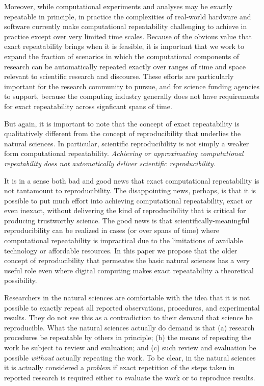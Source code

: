 Moreover, while computational experiments and analyses may be exactly repeatable in principle, 
	in practice the complexities of real-world hardware and software currently make computational repeatability 
	challenging to achieve in practice except over very limited time scales.
Because of the obvious value that exact repeatability brings when it is feasible, it is important that we work to
	expand the fraction of scenarios in which the computational components of research can be automatically 
	repeated exactly over ranges of time and space relevant to scientific research and discourse.
These efforts are particularly important for the research community to pursue, and for science funding
	agencies to support, because the computing industry generally does not have requirements for exact 
	repeatability across signficant spans of time.

But again, it is important to note  that the concept of exact repeatability is 
	qualitatively different from the concept of reproducibility that underlies the natural sciences.
In particular, scientific reproducibility is not simply a weaker form computational repeatability.  
\emph{Achieving or approximating computational repeatability does not automatically deliver scientific reproducibility.}

It is in a sense both bad and good news that exact computational repeatability is not tantamount to reproducibility.
The disappointing news, perhaps, is that it is possible to put much effort into achieving computational repeatability,
	exact or even inexact,
	without delivering the kind of reproducibility that is critical for producing trustworthy science.
The good news is that scientifically-meaningful reproducibility can be realized in cases (or over spans of time)
	where computational repeatability is impractical due to the limitations of available technology or affordable resources.
In this paper we propose that the older concept of reproducibility that permeates the basic natural sciences has a very
	useful role even where digital computing makes exact repeatability a theoretical possibility.

 Researchers in the natural sciences are comfortable with the idea that it is not possible to exactly
	repeat all reported observations, procedures, and experimental results.
They do not see this as a contradiction to their demand that science be reproducible.
What the natural sciences actually do demand is that 
	(a) research procedures be repeatable by others in principle;
	(b) the means of repeating the work be subject to review and evaluation; 
	and (c) such review and evaluation be possible \emph{without} actually repeating the work.
To be clear, in the natural sciences it is actually considered a \emph{problem} if exact repetition of the steps
	taken in reported research is required either to evaluate the work or to reproduce results.

